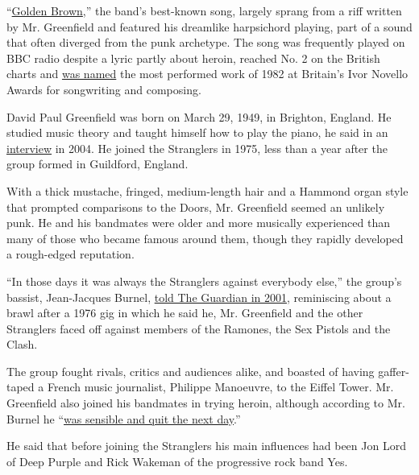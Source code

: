 ``\href{https://www.youtube.com/watch?v=Qca9ByvLhBA}{Golden Brown},''
the band's best-known song, largely sprang from a riff written by Mr.
Greenfield and featured his dreamlike harpsichord playing, part of a
sound that often diverged from the punk archetype. The song was
frequently played on BBC radio despite a lyric partly about heroin,
reached No. 2 on the British charts and
\href{https://www.facebook.com/thestranglers/posts/on-this-day-5th-may-1983-the-stranglers-golden-brown-was-named-most-performed-wo/310825798997141/}{was
named} the most performed work of 1982 at Britain's Ivor Novello Awards
for songwriting and composing.

David Paul Greenfield was born on March 29, 1949, in Brighton, England.
He studied music theory and taught himself how to play the piano, he
said in an
\href{https://books.google.gr/books?id=iI77AwAAQBAJ\&pg=PA150\&lpg=PA150\&dq=dave+greenfield+ray+manzarek\&source=bl\&ots=te-FM0K1Fb\&sig=ACfU3U2FsTjf9nAmIR-IYqC-60KKkOWkiw\&hl=en\&sa=X\&ved=2ahUKEwiD4YS6gZ_pAhVhxoUKHTqWDBw4ChDoATABegQICRAB\#v=onepage\&q=dave\%20greenfield\%20ray\%20manzarek\&f=false}{interview}
in 2004. He joined the Stranglers in 1975, less than a year after the
group formed in Guildford, England.

With a thick mustache, fringed, medium-length hair and a Hammond organ
style that prompted comparisons to the Doors, Mr. Greenfield seemed an
unlikely punk. He and his bandmates were older and more musically
experienced than many of those who became famous around them, though
they rapidly developed a rough-edged reputation.

``In those days it was always the Stranglers against everybody else,''
the group's bassist, Jean-Jacques Burnel,
\href{https://www.theguardian.com/culture/2001/aug/10/artsfeatures}{told
The Guardian in 2001}, reminiscing about a brawl after a 1976 gig in
which he said he, Mr. Greenfield and the other Stranglers faced off
against members of the Ramones, the Sex Pistols and the Clash.

The group fought rivals, critics and audiences alike, and boasted of
having gaffer-taped a French music journalist, Philippe Manoeuvre, to
the Eiffel Tower. Mr. Greenfield also joined his bandmates in trying
heroin, although according to Mr. Burnel he
``\href{https://www.theguardian.com/music/2014/mar/12/stranglers-40-years-fights-drugs-ufos}{was
sensible and quit the next day}.''

He said that before joining the Stranglers his main influences had been
Jon Lord of Deep Purple and Rick Wakeman of the progressive rock band
Yes.

